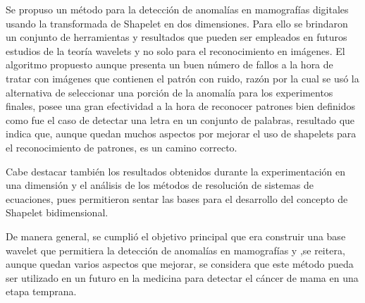 \begin{conclusions}
    \par Se propuso un m\'etodo para la detecci\'on de anomal\'ias en mamograf\'ias digitales usando la transformada de Shapelet en dos dimensiones. Para ello se brindaron un conjunto de herramientas y resultados que pueden ser empleados en futuros estudios de la teor\'ia wavelets y no solo para el reconocimiento en im\'agenes. El algoritmo propuesto aunque presenta un buen n\'umero de fallos a la hora de tratar con im\'agenes que contienen el patr\'on con ruido, raz\'on por la cual se us\'o la alternativa de seleccionar una porci\'on de la anomal\'ia para los experimentos finales, posee una gran efectividad a la hora de reconocer patrones bien definidos como fue el caso de detectar una letra en un conjunto de palabras, resultado que indica que, aunque quedan muchos aspectos por mejorar el uso de shapelets para el reconocimiento de patrones, es un camino correcto.
    \par Cabe destacar tambi\'en los resultados obtenidos durante la experimentaci\'on en una dimensi\'on y el an\'alisis de los m\'etodos de resoluci\'on de sistemas de ecuaciones, pues permitieron sentar las bases para el desarrollo del concepto de Shapelet bidimensional.
    \par De manera general, se cumpli\'o el objetivo principal que era construir una base wavelet que permitiera la detecci\'on de anomal\'ias en mamograf\'ias y ,se reitera, aunque quedan varios aspectos que mejorar, se considera que este m\'etodo pueda ser utilizado en un futuro en la medicina para detectar el c\'ancer de mama en una etapa temprana.
\end{conclusions}
